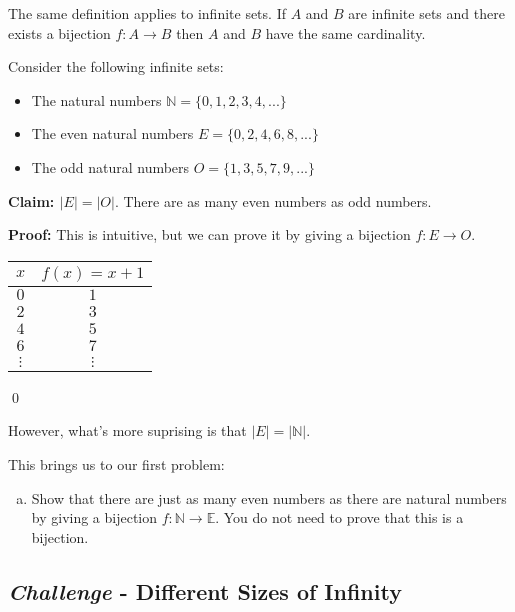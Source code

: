 \documentclass[12pt,letterpaper]{article}
\newcommand\N{\mathbb N}
\newenvironment{22enumerate}{\begin{enumerate}[a.]\itemsep0em}{\end{enumerate}}
\newenvironment{22itemize}{\begin{itemize}\itemsep0em}{\end{itemize}}
\newif\ifsol
\newcommand{\solu}[2]{ \begin{mdframed} \ifsol #2 \else \vspace{#1} \fi \end{mdframed} }
\begin{document}
      The same definition applies to infinite sets. If $A$ and $B$ are infinite sets and there exists a bijection $f : A \rightarrow B$ then $A$ and $B$ have the same cardinality.

      Consider the following infinite sets:
      \begin{22itemize}
      \item The natural numbers $\N = \{0, 1, 2, 3, 4, ...\}$
      \item The even natural numbers $E = \{0, 2, 4, 6, 8, ...\}$
      \item The odd natural numbers $O = \{1, 3, 5, 7, 9, ...\}$
      \end{22itemize}

      \textbf{Claim: $|E| = |O|$}. There are as many even numbers as odd numbers.

      \textbf{Proof:} This is intuitive, but we can prove it by giving a bijection $f: E \rightarrow O$.

      \begin{center}
      \begin{tabular}{c | c}
        $x$ & $f(x) = x + 1$ \\
        \hline $0$ & $1$ \\
         $2$ & $3$ \\
         $4$ & $5$ \\
         $6$ & $7$ \\
         $\vdots$ & $\vdots$ \\
      \end{tabular}
      \end{center}\qed

      However, what's more suprising is that $|E| = |\N|$.

      This brings us to our first problem:

      \begin{22enumerate}
      \item Show that there are just as many even numbers as there are natural numbers
        by giving a bijection $f:\N \rightarrow \mathbb{E}$.
        You do not need to prove that this is a bijection.

        \solu{4cm}{$f(n) = 2n$}

      \end{22enumerate}

      \subsection*{\textit{Challenge} - Different Sizes of Infinity}
\end{document}
